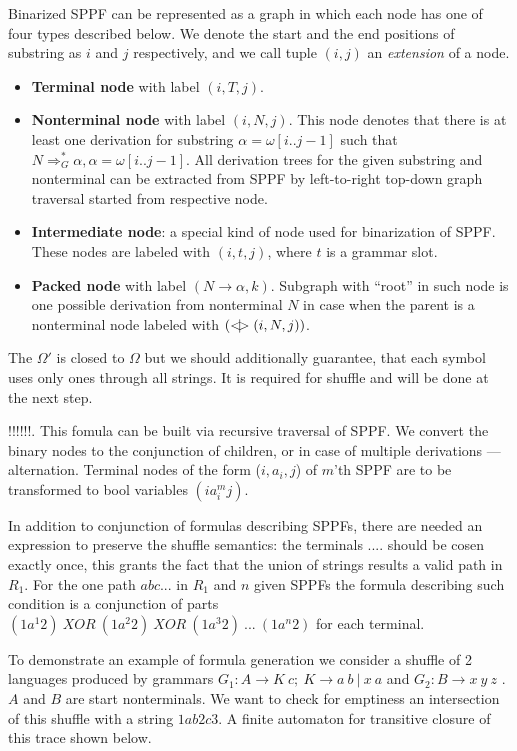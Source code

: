 Binarized SPPF can be represented as a graph in which each node has one of four types described below.
We denote the start and the end positions of substring as $i$ and $j$ respectively, and we call tuple $(i,j)$ an \textit{extension} of a node.

\begin{itemize}
    \item \textbf{Terminal node} with label $(i, T, j)$.
    \item \textbf{Nonterminal node} with label $(i, N, j)$. 
    This node denotes that there is at least one derivation for substring $\alpha=\omega[i..j-1]$ such that $N \Rightarrow^*_G \alpha, \alpha = \omega[i..j-1] $.
    All derivation trees for the given substring and nonterminal can be extracted from SPPF by left-to-right top-down graph traversal started from respective node.     
    \item \textbf{Intermediate node}: a special kind of node used for binarization of SPPF. These nodes are labeled with $(i,t,j)$, where $t$ is a grammar slot.
    \item \textbf{Packed node} with label $(N \rightarrow \alpha, k)$. 
    Subgraph with ``root'' in such node is one possible derivation from nonterminal $N$ in case when the parent is a nonterminal node labeled with $(<\mkern-9mu | \mkern-9mu> (i, N, j))$.
    
\end{itemize}

The $\Omega'$ is closed to $\Omega$ but we should additionally guarantee, that each symbol uses only ones through all strings.
It is required for shuffle and will be done at the next step.


!!!!!!. This fomula 
can be built via recursive traversal of SPPF. We convert the binary nodes to the conjunction of children, or in case of multiple 
derivations --- alternation. Terminal nodes of the form ($i,a_i,j$) of $m$'th SPPF are to be transformed to bool
variables $(ia_i^mj)$.

In addition to conjunction of formulas describing SPPFs, there are needed an expression to preserve the
shuffle semantics: the terminals .... should be cosen exactly once, this grants the fact that the union of strings results a valid 
path in $R_1$. For the one path $a b c ...$ in $R_1$ and $n$ given SPPFs the formula describing such condition is a 
conjunction of parts $(1a^1 2)\ XOR\ (1a^2 2)\ XOR\ (1a^3 2)\ ...\ (1a^n 2) $ for each terminal.


To demonstrate an example of formula generation we consider a shuffle of 2 languages 
produced by grammars $G_1: A\rightarrow K\ c;\ K \rightarrow a\ b\ |\ x\ a$ %
and $G_2: B \rightarrow x\ y\ z$ %
. $A$ and $B$ are start nonterminals.
We want to check for emptiness an intersection of this shuffle with a string $1ab2c3$. 
A finite automaton for transitive closure of this trace shown below.

